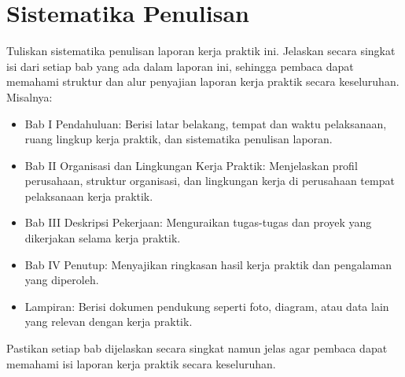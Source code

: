 \section{Sistematika Penulisan}
Tuliskan sistematika penulisan laporan kerja praktik ini. Jelaskan secara singkat isi dari setiap bab yang ada dalam laporan ini, sehingga pembaca dapat memahami struktur dan alur penyajian laporan kerja praktik secara keseluruhan.
Misalnya:
\begin{itemize}
    \item Bab I Pendahuluan: Berisi latar belakang, tempat dan waktu pelaksanaan, ruang lingkup kerja praktik, dan sistematika penulisan laporan.
    \item Bab II Organisasi dan Lingkungan Kerja Praktik: Menjelaskan profil perusahaan, struktur organisasi, dan lingkungan kerja di perusahaan tempat pelaksanaan kerja praktik.
    \item Bab III Deskripsi Pekerjaan: Menguraikan tugas-tugas dan proyek yang dikerjakan selama kerja praktik.
    \item Bab IV Penutup: Menyajikan ringkasan hasil kerja praktik dan pengalaman yang diperoleh.
    \item Lampiran: Berisi dokumen pendukung seperti foto, diagram, atau data lain yang relevan dengan kerja praktik.
\end{itemize}
Pastikan setiap bab dijelaskan secara singkat namun jelas agar pembaca dapat memahami isi laporan kerja praktik secara keseluruhan.

